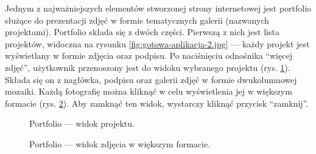 \documentclass[a4paper, 12pt, twoside]{article}
\numberwithin{figure}{section}
\begin{document}
\begin{sloppypar}
Jednym z najważniejszych elementów stworzonej strony internetowej jest portfolio służące do prezentacji zdjęć w formie tematycznych galerii (nazwanych projektami). Portfolio składa się z dwóch części. Pierwszą z nich jest lista projektów, widoczna na rysunku \ref{fig:gotowa-aplikacja-2.jpg} --- każdy projekt jest wyświetlany w formie zdjęcia oraz podpisu. Po naciśnięciu odnośnika ``więcej zdjęć'', użytkownik przenoszony jest do widoku wybranego projektu (rys. \ref{fig:gotowa-aplikacja-3.jpg}). Składa się on z nagłówka, podpisu oraz galerii zdjęć w formie dwukolumnowej mozaiki. Każdą fotografię można kliknąć w celu wyświetlenia jej w większym formacie (rys. \ref{fig:gotowa-aplikacja-4.jpg}). Aby zamknąć ten widok, wystarczy kliknąć przycisk ``zamknij''. 

\begin{figure}[H] 
    \centering
   \caption{Portfolio --- widok projektu.}
   \label{fig:gotowa-aplikacja-3.jpg}
\end{figure}

\begin{figure}[H] 
    \centering
   \caption{Portfolio --- widok zdjęcia w większym formacie.}
   \vspace{-4mm}
   \label{fig:gotowa-aplikacja-4.jpg}
\end{figure}


\end{sloppypar}
\end{document}
